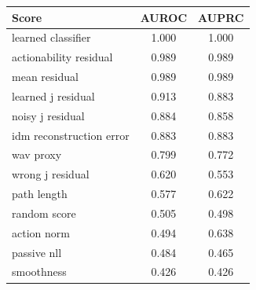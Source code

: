 \begin{tabular}{lcc}\toprule
Score & AUROC & AUPRC\\\midrule
learned classifier & 1.000 & 1.000\\
actionability residual & 0.989 & 0.989\\
mean residual & 0.989 & 0.989\\
learned j residual & 0.913 & 0.883\\
noisy j residual & 0.884 & 0.858\\
idm reconstruction error & 0.883 & 0.883\\
wav proxy & 0.799 & 0.772\\
wrong j residual & 0.620 & 0.553\\
path length & 0.577 & 0.622\\
random score & 0.505 & 0.498\\
action norm & 0.494 & 0.638\\
passive nll & 0.484 & 0.465\\
smoothness & 0.426 & 0.426\\
\bottomrule\end{tabular}
